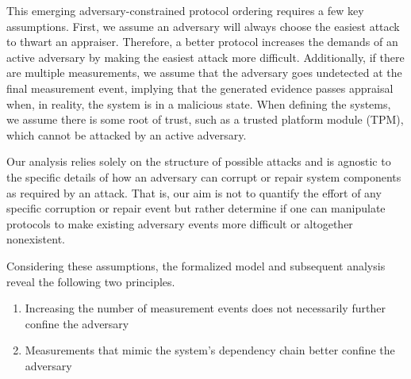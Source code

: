 \documentclass[runningheads]{llncs}
\theoremstyle{definition}
\newcommand{\squash}{\itemsep=0pt\parskip=0pt}
\begin{document}
This emerging adversary-constrained protocol ordering requires a few key assumptions. First, we assume an adversary will always choose the easiest attack to thwart an appraiser. Therefore, a better protocol increases the demands of an active adversary by making the easiest attack more difficult. Additionally, if there are multiple measurements, we assume that the adversary goes undetected at the final measurement event, implying that the generated evidence passes appraisal when, in reality, the system is in a malicious state. When defining the systems, we assume there is some root of trust, such as a trusted platform module (TPM), which cannot be attacked by an active adversary.

Our analysis relies solely on the structure of possible attacks and is agnostic to the specific details of how an adversary can corrupt or repair system components as required by an attack. That is, our aim is not to quantify the effort of any specific corruption or repair event but rather determine if one can manipulate protocols to make existing adversary events more difficult or altogether nonexistent.

Considering these assumptions, the formalized model and subsequent analysis reveal the following two principles.

\begin{enumerate}
    \item Increasing the number of measurement events does not necessarily further confine the adversary 
    \item Measurements that mimic the system's dependency chain better confine the adversary
\end{enumerate}

\end{document}
